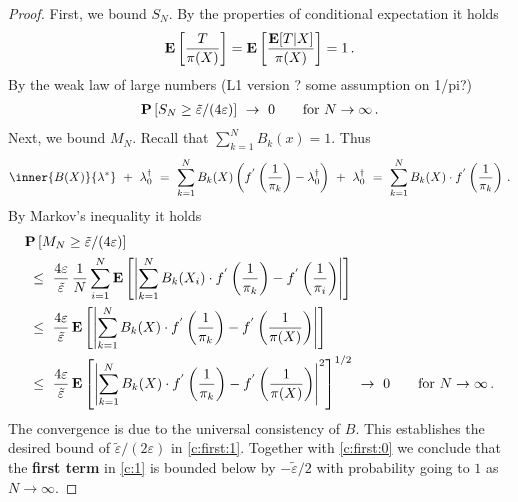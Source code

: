 \begin{proof}
First, we bound $S_N$.
By the properties of conditional expectation it holds
\begin{gather*}
  \mathbf{E}
  \left[ 
    \frac{T}{\pi(X)}
  \right]
  =
  \mathbf{E}
  \left[ 
    \frac{\mathbf{E}[T|X]}{\pi(X)}
  \right]
  =1
  \,.
\end{gather*}
By the weak law of large numbers (L1 version ? some assumption on 1/pi?)
\begin{gather}
  \P
  \left[ 
    S_N
    \ge
\tilde{\varepsilon}
/(4\varepsilon)
  \right]
  \ 
  \to 
  \ 
  0
  \qquad 
  \text{for}\ 
  N\to \infty
  \,.
\end{gather}
Next, we bound $M_N$.
Recall that $\sum_{k=1}^{N}B_k(x)=1$. Thus
\begin{gather*}
        \inner
       {B(X)}
       {\lambda^*}
      \ 
       +
      \ 
      \lambda^\dagger_0
      \ 
      =
      \ 
      \sum_{k=1}^{N} 
      B_k(X)
      \left( 
        f^{'}
        \left( 
          \frac{1}{\pi_k}
      \right)
      -
      \lambda_0^\dagger
      \right)
      \ 
      +
      \ 
      \lambda_0^\dagger
      \ 
      =
      \ 
      \sum_{k=1}^{N} 
      B_k(X)
      \cdot
        f^{'}
        \left( 
          \frac{1}{\pi_k}
      \right)
      \,.
\end{gather*}
By Markov's inequality it holds
\begin{align*}
  &
  \P \left[ 
    M_N \ge 
\tilde{\varepsilon}
/(4\varepsilon)
  \right]
  \\
  &
  \ 
  \le
  \ 
  \frac{4\varepsilon}{
\tilde{\varepsilon}
  }
  \, 
  \frac{1}{N}
  \sum_{i=1}^{N} 
  \E
  \left[ 
    \left| 
      \sum_{k=1}^{N} 
      B_k(X_i)
      \cdot
        f^{'}
        \left( 
          \frac{1}{\pi_k}
      \right)
      -
        f^{'}
        \left( 
          \frac{1}{\pi_i}
      \right)
    \right|
  \right]
  \\
  &
  \ 
  \le
  \ 
  \frac{4\varepsilon}{
\tilde{\varepsilon}
  }
  \, 
  \E
  \left[ 
    \left| 
      \sum_{k=1}^{N} 
      B_k(X)
      \cdot
        f^{'}
        \left( 
          \frac{1}{\pi_k}
      \right)
      -
        f^{'}
        \left( 
          \frac{1}{\pi(X)}
      \right)
    \right|
  \right]
  \\
  &
  \ 
  \le
  \ 
  \frac{4\varepsilon}{
\tilde{\varepsilon}
}
  \, 
  \E
  \left[ 
    \left| 
      \sum_{k=1}^{N} 
      B_k(X)
      \cdot
        f^{'}
        \left( 
          \frac{1}{\pi_k}
      \right)
      -
        f^{'}
        \left( 
          \frac{1}{\pi(X)}
      \right)
    \right|
    ^2
  \right]
  ^{1/2}
  \ 
  \to 
  \ 
  0
  \qquad 
  \text{for}\ 
  N\to \infty
  \,.
\end{align*}
The convergence is due to the universal consistency of $B$.
This establishes the desired bound of 
$
\tilde{\varepsilon}/(2\varepsilon)
$
in \eqref{c:first:1}.
Together with \eqref{c:first:0}
we conclude that the \textbf{first term} 
in
\eqref{c:1}
is bounded below by
$
-
\tilde{\varepsilon}/2
$
with probability going to $1$ as $N\to\infty$.

\end{proof}
